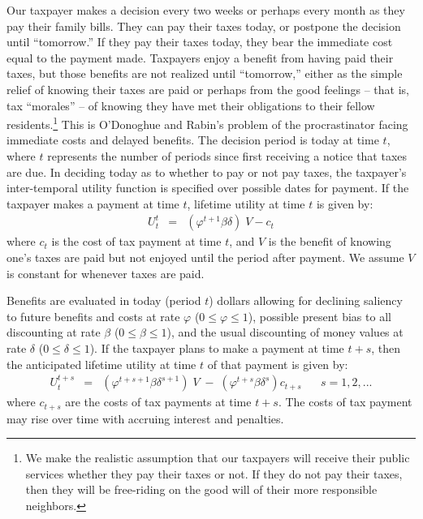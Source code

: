 \documentclass[12pt]{article}
\begin{document}
Our taxpayer makes a decision every two weeks or perhaps every month
as they pay their family bills.  They can pay their taxes today, or
postpone the decision until ``tomorrow.''  If they pay their taxes
today, they bear the immediate cost equal to the payment made.
Taxpayers enjoy a benefit from having paid their taxes, but those
benefits are not realized until ``tomorrow,'' either as the simple
relief of knowing their taxes are paid or perhaps from the good
feelings -- that is, tax ``morales'' -- of knowing they have met their
obligations to their fellow residents.\footnote{ We make the realistic
  assumption that our taxpayers will receive their public services
  whether they pay their taxes or not.  If they do not pay their
  taxes, then they will be free-riding on the good will of their more
  responsible neighbors.  }  This is O'Donoghue and Rabin's problem of
the procrastinator facing immediate costs and delayed benefits. The
decision period is today at time $t$, where $t$ represents the number
of periods since first receiving a notice that taxes are due.  In
deciding today as to whether to pay or not pay taxes, the taxpayer's
inter-temporal utility function is specified over possible dates for
payment. If the taxpayer makes a payment at time $t$, lifetime
utility at time $t$ is given by:
\begin{eqnarray}\label{eq1}
U_t^t  &=& (\varphi^{t+1} \beta \delta) \;  V - c_ t 
\end{eqnarray}
where $c_t$ is the cost of tax payment at time $t$, and $V$ is the
benefit of knowing one's taxes are paid but not enjoyed until the
period after payment.  We assume $V$ is constant for whenever taxes
are paid. 

Benefits are evaluated in today (period $t$) dollars allowing for
declining saliency to future benefits and costs at rate $\varphi$ ($0
\le \varphi \le 1$), possible present bias to all discounting at rate
$\beta$ ($0 \le \beta \le 1$), and the usual discounting of money
values at rate $\delta$ ($0 \le \delta\le 1$).  If the taxpayer plans
to make a payment at time $t + s$, then the anticipated lifetime
utility at time $t$ of that payment is given by:
\begin{eqnarray}\label{eq2}
U_t^{t+s} &=& (\varphi^{t+s+1} \beta \delta^{s+1}) \; V \; - \; (\varphi^{t+s}
\beta \delta^{s}) c_ {t+s} \; \; \; \; \; \; s=1,2, ...
\end{eqnarray}
where $c_{t+s}$ are the costs of tax payments at time $t+s$. The costs
of tax payment may rise over time with accruing interest and
penalties.
\end{document}
